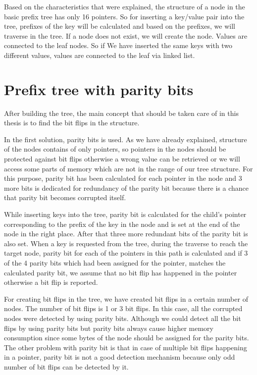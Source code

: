 \documentclass{report}
\begin{document}
Based on the characteristics that were explained, the structure of a node in the basic prefix tree has only 16 pointers. So for inserting a key/value pair into the tree, prefixes of the key will be calculated and based on the prefixes, we will traverse in the tree. If a node does not exist, we will create the node. Values are connected to the leaf nodes. So if We have inserted the same keys with two different values, values are connected to the leaf via linked list.  
 
 
\section{ Prefix tree with parity bits}
 
After building the tree, the main concept that should be taken care of in this thesis is to find the bit flips in the structure.
 
In the first solution, parity bits is used. As we have already explained, structure of the nodes contains of only pointers, so pointers in the nodes should be protected against bit flips otherwise a wrong value can be retrieved or we will access some parts of memory which are not in the range of our tree structure. For this purpose, parity bit has been calculated for each pointer in the node and 3 more bits is dedicated for redundancy of the parity bit because there is a chance that parity bit becomes corrupted itself.

 While inserting keys into the tree, parity bit is calculated for the child's pointer corresponding to the prefix of the key in the node and is set at the end of the node in the right place. After that three more redundant bits of the parity bit is also set. When a key is requested from the tree, during the traverse to reach the target node, parity bit for each of the pointers in this path is calculated and if 3 of the 4 parity bits which had been assigned for the pointer, matches the calculated parity bit, we assume that no bit flip has happened in the pointer otherwise a bit flip is reported.

For creating bit flips in the tree, we have created bit flips in a certain number of nodes. The number of bit flips is 1 or 3 bit flips. In this case, all the corrupted nodes were detected by using parity bits.
Although we could detect all the bit flips by using parity bits but parity bits always cause higher memory consumption since some bytes of the node should be assigned for the parity bits. The other problem with parity bit is that in case of multiple bit flips happening in a pointer, parity bit is not a good detection mechanism because only odd number of bit flips can be detected by it.  
\end{document}
